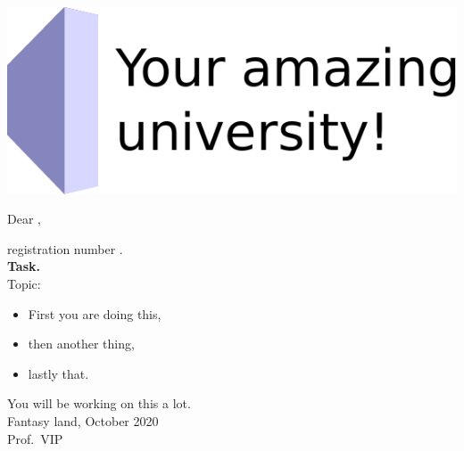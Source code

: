 \begin{center}
\makeatletter
\includegraphics[height=9ex]{./images/logos/university_logo.pdf}

\vspace{1\baselineskip}

Dear \@author,

registration number \@immnumber.\\[0.5\baselineskip]

\textbf{\@thesis{} Task.}\\[0.5\baselineskip]

Topic:

\begin{english}
	\bfseries\@title
\end{english}
\makeatother
\end{center}
{%
\lipsum
\begin{itemize}
	\item First you are doing this,
	\item then another thing,
	\item lastly that.
\end{itemize}
}%
\vspace{\baselineskip}

\noindent You will be working on this a lot.\\[0.4\baselineskip]

\noindent Fantasy land, October 2020\\[2\baselineskip]

\noindent Prof.\ VIP
